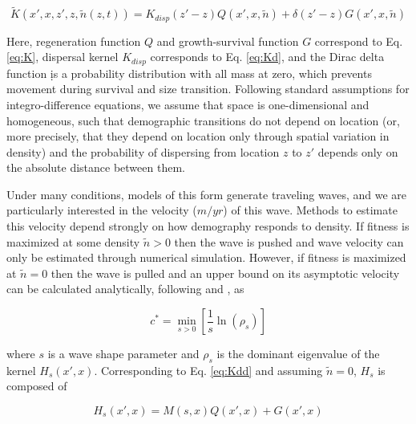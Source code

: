 \documentclass[11pt]{article}\usepackage[]{graphicx}\usepackage[usenames,dvipsnames]{xcolor}
\begin{document}
\begin{linenomath*} 
\begin{equation} \label{eq:Kdd}
\tilde{K}(x\prime,x,z\prime,z,\tilde{n}(z,t)) = K_{disp}(z\prime-z)Q(x\prime,x,\tilde{n}) + \delta(z\prime-z)G(x\prime,x,\tilde{n})
\end{equation} 
\end{linenomath*}

Here, regeneration function $Q$ and growth-survival function $G$ correspond to Eq. \ref{eq:K}, dispersal kernel $K_{disp}$ corresponds to Eq. \ref{eq:Kd}, and the Dirac delta function \d is a probability distribution with all mass at zero, which prevents movement during survival and size transition. 
Following standard assumptions for integro-difference equations, we assume that space is one-dimensional and homogeneous, such that demographic transitions do not depend on location (or, more precisely, that they depend on location only through spatial variation in density) and the probability of dispersing from location $z$ to $z\prime$ depends only on the absolute distance between them.

Under many conditions, models of this form generate traveling waves, and we are particularly interested in the velocity ($m/yr$) of this wave.
Methods to estimate this velocity depend strongly on how demography responds to density. 
If fitness is maximized at some density $\tilde{n}>0$ then the wave is pushed and wave velocity can only be estimated through numerical simulation. 
However, if fitness is maximized at $\tilde{n}=0$ then the wave is pulled and an upper bound on its asymptotic velocity can be calculated analytically, following \cite{neubert2000demography} and \cite{jongejans2011importance}, as

\begin{linenomath*} 
\begin{equation} 
c^* = \min_{s > 0} \left[\frac{1}{s}\ln(\rho_{s})\right] 
\end{equation} 
\end{linenomath*} 

where $s$ is a wave shape parameter and $\rho_{s}$ is the dominant eigenvalue of the kernel $H_{s}(x\prime,x)$.
Corresponding to Eq. \ref{eq:Kdd} and assuming $\tilde{n}=0$, $H_{s}$ is composed of

\begin{linenomath*} 
\begin{equation} 
H_{s}(x\prime,x) = M(s,x)Q(x\prime,x) + G(x\prime,x)
\end{equation} 
\end{linenomath*}
\end{document}
